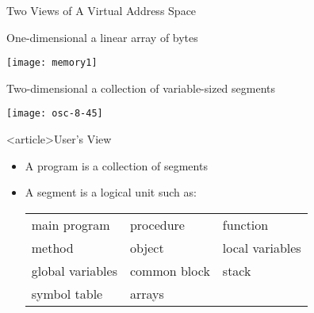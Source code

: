 \begin{frame}{Two Views of A Virtual Address Space}
  \begin{minipage}{.45\textwidth}
    \begin{iblock}{One-dimensional}
      a linear array of bytes
      \begin{center}
        \texttt{[image: memory1]}
      \end{center}
    \end{iblock}
  \end{minipage}\hfill
  \begin{minipage}{.45\textwidth}
    \begin{iblock}{Two-dimensional}
      a collection of variable-sized segments
      \begin{center}
        \texttt{[image: osc-8-45]}
      \end{center}
    \end{iblock}
  \end{minipage}
\end{frame}

\begin{frame}<article>{User's View}
  \begin{itemize}
  \item A program is a collection of segments
  \item A segment is a logical unit such as:
    \begin{center}
      \begin{small}
        \begin{tabular}{lll}
          main program&procedure&function\\
          method&object&local variables\\
          global variables&common block&stack\\
          symbol table&arrays
        \end{tabular}
      \end{small}
    \end{center}
  \end{itemize}
\end{frame}

